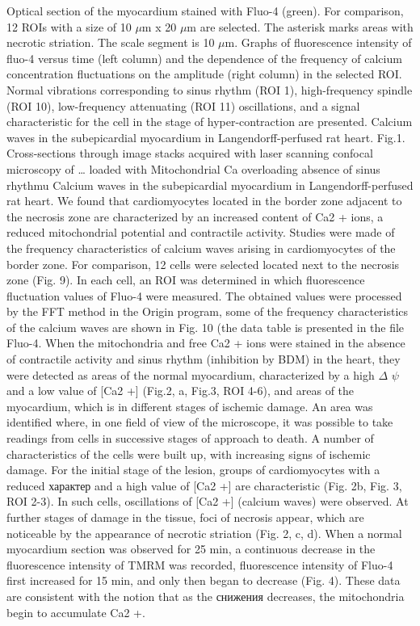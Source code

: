 \documentclass[a4paper,12pt]{article}
\begin{document}
Optical section of the myocardium stained with Fluo-4 (green). For comparison, 12 ROIs with a size of 10 $\mu$m x 20 $\mu$m are selected. The asterisk marks areas with necrotic striation. The scale segment is 10 $\mu$m.
Graphs of fluorescence intensity of fluo-4 versus time (left column) and the dependence of the frequency of calcium concentration fluctuations on the amplitude (right column) in the selected ROI. Normal vibrations corresponding to sinus rhythm (ROI 1), high-frequency spindle (ROI 10), low-frequency attenuating (ROI 11) oscillations, and a signal characteristic for the cell in the stage of hyper-contraction are presented.
Calcium waves in the subepicardial myocardium in Langendorff-perfused rat heart. Fig.1. Cross-sections through image stacks acquired with laser scanning confocal microscopy of … loaded with
Mitochondrial Ca overloading absence of sinus rhythmu
Calcium waves in the subepicardial myocardium in Langendorff-perfused rat heart.
We found that cardiomyocytes located in the border zone adjacent to the necrosis zone are characterized by an increased content of Ca2 + ions, a reduced mitochondrial potential and contractile activity. Studies were made of the frequency characteristics of calcium waves arising in cardiomyocytes of the border zone. For comparison, 12 cells were selected located next to the necrosis zone (Fig. 9). In each cell, an ROI was determined in which fluorescence fluctuation values of Fluo-4 were measured. The obtained values were processed by the FFT method in the Origin program, some of the frequency characteristics of the calcium waves are shown in Fig. 10 (the data table is presented in the file Fluo-4.
When the mitochondria and free Ca2 + ions were stained in the absence of contractile activity and sinus rhythm (inhibition by BDM) in the heart, they were detected as areas of the normal myocardium, characterized by a high $\Delta$ $\psi$ and a low value of [Ca2 +] (Fig.2, a, Fig.3, ROI 4-6), and areas of the myocardium, which is in different stages of ischemic damage.
An area was identified where, in one field of view of the microscope, it was possible to take readings from cells in successive stages of approach to death. A number of characteristics of the cells were built up, with increasing signs of ischemic damage.
For the initial stage of the lesion, groups of cardiomyocytes with a reduced  характер and a high value of [Ca2 +] are characteristic (Fig. 2b, Fig. 3, ROI 2-3). In such cells, oscillations of [Ca2 +] (calcium waves) were observed. At further stages of damage in the tissue, foci of necrosis appear, which are noticeable by the appearance of necrotic striation (Fig. 2, c, d). When a normal myocardium section was observed for 25 min, a continuous decrease in the fluorescence intensity of TMRM was recorded, fluorescence intensity of Fluo-4 first increased for 15 min, and only then began to decrease (Fig. 4). These data are consistent with the notion that as the снижения decreases, the mitochondria begin to accumulate Ca2 +.
\end{document}
